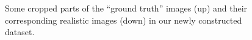 \begin{figure}
{\begin{minipage}[t]{0.24\textwidth}
\end{minipage}
\begin{minipage}[t]{0.24\textwidth}
\centering
{}
\end{minipage}
\begin{minipage}[t]{0.24\textwidth}
\centering
{}
\end{minipage}
}
    \caption{Some cropped parts of the ``ground truth'' images (up) and their corresponding realistic images (down) in our newly constructed dataset.}
    \label{fig6-3}
\end{figure}

